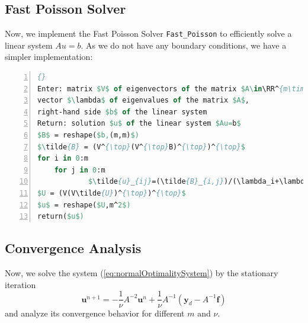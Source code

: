 \documentclass{amsart}
\theoremstyle{definition}
\theoremstyle{remark}
\numberwithin{equation}{section}
\newcommand{\RR}{\mathbb{R}}
\renewcommand{\vec}{\textbf}
\begin{document}

\subsection{Fast Poisson Solver}
Now, we implement the Fast Poisson Solver \texttt{Fast\_Poisson} to efficiently solve a linear system $Au=b$. As we do not have any boundary conditions, we have a simpler implementation:

\begin{lstlisting}[mathescape, language=Pascal, title=Fast\_Poisson,
frame=single, numbers=left, numberstyle=\tiny, tabsize=2,
morekeywords={Enter, Return, elif}, deletekeywords={of}, keywordstyle=\bfseries]{}
Enter: matrix $V$ of eigenvectors of the matrix $A\in\RR^{m\times m}$, 
vector $\lambda$ of eigenvalues of the matrix $A$, 
right-hand side $b$ of the linear system
Return: solution $u$ of the linear system $Au=b$
$B$ = reshape($b,(m,m)$)
$\tilde{B} = (V^{\top}(V^{\top}B)^{\top})^{\top}$
for i in 0:m
	for j in 0:m
			$\tilde{u}_{ij}=(\tilde{B}_{i,j})/(\lambda_i+\lambda_j)$
$U = (V(V\tilde{U})^{\top})^{\top}$
$u$ = reshape($U,m^2$)
return($u$)
\end{lstlisting}


\subsection{Convergence Analysis}
Now, we solve the system (\ref{eq:normalOptimalitySystem}) by the stationary iteration
\begin{equation}
\vec{u}^{n+1} = -\frac{1}{\nu} A^{-2}\vec{u}^n + \frac{1}{\nu} A^{-1} (\vec{y}_d-A^{-1}\vec{f})
\end{equation}
and analyze its convergence behavior for different $m$ and $\nu$.
\end{document}
